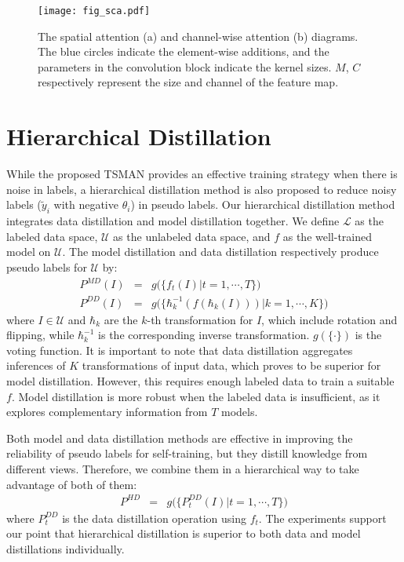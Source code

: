 \documentclass[letterpaper]{article} %
\begin{document}
\label{sec:sca}\begin{figure}[t]
	\begin{center}
		\texttt{[image: fig\_sca.pdf]}
	\end{center}
	\caption{The spatial attention (a) and channel-wise attention (b) diagrams. The blue circles indicate the element-wise additions, and the parameters in the convolution block indicate the kernel sizes. $M$, $C$ respectively represent the size and channel of the feature map. }
	\label{fig:csa}
\end{figure}\section{Hierarchical Distillation}\label{sec:hd}

While the proposed TSMAN provides an effective training strategy when there is noise in labels, a hierarchical distillation method is also proposed to reduce noisy labels ($\widetilde{y}_i$ with negative $\theta_i$) in pseudo labels. Our hierarchical distillation method integrates data distillation and model distillation together.
We define $\mathcal{L}$ as the labeled data space, $\mathcal{U}$ as the unlabeled data space, and
$f$ as the well-trained model on $\mathcal{U}$. The model distillation and data distillation respectively produce pseudo labels for $\mathcal{U}$ by:
\begin{eqnarray}\label{eq:md_dd}
P^{MD}(I) &=& g\big(\{f_t(I)|t=1,\cdots,T\}\big)\\
P^{DD}(I) &=& g\Big(\big\{\hbar^{-1}_{k}(f(\hbar_k(I)))|k=1,\cdots,K\big\}\Big)
\end{eqnarray}
where $I\in \mathcal{U}$ and $\hbar_{k}$ are the $k$-th transformation for $I$, which include rotation and flipping, while $\hbar_{k}^{-1}$ is the corresponding inverse transformation.
$g(\{\cdot\})$ is the voting function.
It is important to note that data distillation aggregates inferences of $K$ transformations of input data, which proves to be superior for model distillation.
However, this requires enough labeled data to train a suitable $f$.
Model distillation is more robust when the labeled data is insufficient, as it explores complementary information from $T$ models.

Both model and data distillation methods are effective in improving the reliability of pseudo labels for self-training, but they distill knowledge from different views.
Therefore, we combine them in a hierarchical way to take advantage of both of them:
\begin{eqnarray}\label{eq:hd}
P^{HD} &=& g\big(\{P_{t}^{DD}(I)|t=1,\cdots,T\}\big)
\end{eqnarray}
where $P_{t}^{DD}$ is the data distillation operation using $f_t$.
The experiments support our point that hierarchical distillation is superior to both data and model distillations individually.
\end{document}
